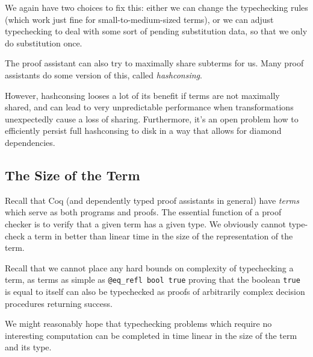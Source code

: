 
We again have two choices to fix this:
either we can change the typechecking rules (which work just fine for small-to-medium-sized terms), or we can adjust typechecking to deal with some sort of pending substitution data, so that we only do substitution once.




The proof assistant can also try to maximally share subterms for us.
Many proof assistants do some version of this, called \emph{hashconsing}.

However, hashconsing looses a lot of its benefit if terms are not maximally shared, and can lead to very unpredictable performance when transformations unexpectedly cause a loss of sharing.
Furthermore, it's an open problem how to efficiently persist full hashconsing to disk in a way that allows for diamond dependencies.

\subsection{The Size of the Term}

Recall that Coq (and dependently typed proof assistants in general) have \emph{terms} which serve as both programs and proofs.
The essential function of a proof checker is to verify that a given term has a given type.
We obviously cannot type-check a term in better than linear time in the size of the representation of the term.

Recall that we cannot place any hard bounds on complexity of typechecking a term, as terms as simple as \texttt{@eq\_refl bool true} proving that the boolean \texttt{true} is equal to itself can also be typechecked as proofs of arbitrarily complex decision procedures returning success.

We might reasonably hope that typechecking problems which require no interesting computation can be completed in time linear in the size of the term and its type.

